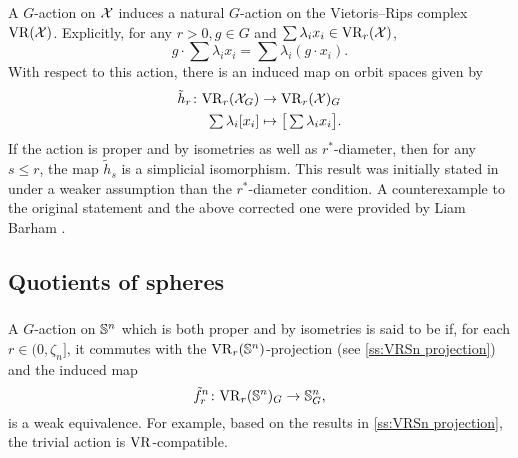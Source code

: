 A \(G\)-action on $\mathcal{X}$ induces a natural \(G\)-action on the Vietoris--Rips complex $\mathrm{VR}(\mathcal{X})$.
Explicitly, for any \(r > 0, g\in G\) and $\sum \lambda_i x_i \in \mathrm{VR}_r(\mathcal{X})$,
\[
g \cdot \sum \lambda_i x_i = \sum \lambda_i (g\cdot x_i).
\]
With respect to this action, there is an induced map on orbit spaces given by
\begin{align*}
	\tilde h_r \colon \mathrm{VR}_r(\mathcal{X}_G) &\to \mathrm{VR}_r(\mathcal{X})_G \\
	\textstyle\sum\lambda_i [x_i] &\mapsto \textstyle \big[\sum\lambda_i x_i\big].
\end{align*}
If the action is proper and by isometries as well as \(r^*\)-diameter, then for any \(s \leq r\), the map $\tilde{h}_s$ is a simplicial isomorphism.
This result was initially stated in \cite[Prop.~3.5]{adams2022metric} under a weaker assumption than the \(r^*\)-diameter condition.
A counterexample to the original statement and the above corrected one were provided by Liam Barham \cite{bibid}.




\subsection{Quotients of spheres}

\subsubsection{}
\label{subsub:VR-compatible-Sn}
A \(G\)-action on \(\mathbb{S}^n\) which is both proper and by isometries is said to be  if, for each $r \in (0, \zeta_n]$, it commutes with the \(\mathrm{VR}_r(\mathbb{S}^n)\)-projection (see \cref{ss:VRSn projection}) and the induced map
\[
\tilde f_r^n \colon \mathrm{VR}_r(\mathbb{S}^n)_G \to \mathbb{S}^n_G,
\]
is a weak equivalence.
For example, based on the results in \cref{ss:VRSn projection}, the trivial action is \(\mathrm{VR}\)-compatible.


